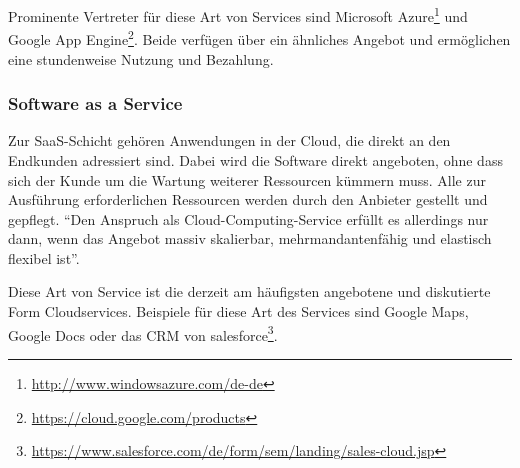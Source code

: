 Prominente Vertreter für diese Art von Services sind Microsoft Azure\footnote{\url{http://www.windowsazure.com/de-de}} und Google App Engine\footnote{\url{https://cloud.google.com/products}}.
Beide verfügen über ein ähnliches Angebot und ermöglichen eine stundenweise Nutzung und Bezahlung.

\subsubsection{Software as a Service}
Zur \ac{SaaS}-Schicht gehören Anwendungen in der Cloud, die direkt an den Endkunden adressiert sind\cite[vgl.][Seite 35]{baun10}.
Dabei wird die Software direkt angeboten, ohne dass sich der Kunde um die Wartung weiterer Ressourcen kümmern muss.
Alle zur Ausführung erforderlichen Ressourcen werden durch den Anbieter gestellt und gepflegt.
"`Den Anspruch als Cloud-Computing-Service erfüllt es allerdings nur dann, wenn das Angebot massiv skalierbar, mehrmandantenfähig und elastisch flexibel ist"'\cite[Seite 47]{hoell11}.

Diese Art von Service ist die derzeit am häufigsten angebotene und diskutierte Form Cloudservices\cite[vgl.][Seite 47]{hoell11}.
Beispiele für diese Art des Services sind Google Maps, Google Docs oder das \ac{CRM} von salesforce\footnote{\url{https://www.salesforce.com/de/form/sem/landing/sales-cloud.jsp}}.
%
%
